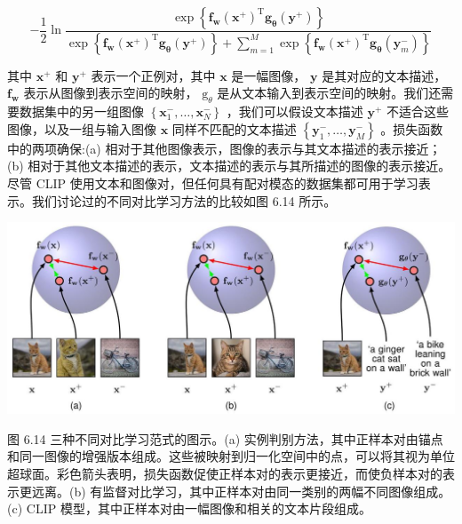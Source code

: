 \documentclass[10pt]{report}
\begin{document}
\[
- \frac{1}{2}\ln \frac{\exp \left\{  {{\mathbf{f}}_{\mathbf{w}}{\left( {\mathbf{x}}^{ + }\right) }^{\mathrm{T}}{\mathbf{g}}_{\mathbf{\theta }}\left( {\mathbf{y}}^{ + }\right) }\right\}  }{\exp \left\{  {{\mathbf{f}}_{\mathbf{w}}{\left( {\mathbf{x}}^{ + }\right) }^{\mathrm{T}}{\mathbf{g}}_{\mathbf{\theta }}\left( {\mathbf{y}}^{ + }\right) }\right\}   + \mathop{\sum }\limits_{{m = 1}}^{M}\exp \left\{  {{\mathbf{f}}_{\mathbf{w}}{\left( {\mathbf{x}}^{ + }\right) }^{\mathrm{T}}{\mathbf{g}}_{\mathbf{\theta }}\left( {\mathbf{y}}_{m}^{ - }\right) }\right\}  } \tag{6.21}
\]

其中 \({\mathbf{x}}^{ + }\) 和 \({\mathbf{y}}^{ + }\) 表示一个正例对，其中 \(\mathbf{x}\) 是一幅图像， \(\mathbf{y}\) 是其对应的文本描述， \({\mathbf{f}}_{\mathbf{w}}\) 表示从图像到表示空间的映射， \({\mathrm{g}}_{\theta }\) 是从文本输入到表示空间的映射。我们还需要数据集中的另一组图像 \(\left\{  {{\mathbf{x}}_{1}^{ - },\ldots ,{\mathbf{x}}_{N}^{ - }}\right\}\) ，我们可以假设文本描述 \({\mathbf{y}}^{ + }\) 不适合这些图像，以及一组与输入图像 \(\mathbf{x}\) 同样不匹配的文本描述 \(\left\{  {{\mathbf{y}}_{1}^{ - },\ldots ,{\mathbf{y}}_{M}^{ - }}\right\}\) 。损失函数中的两项确保:(a) 相对于其他图像表示，图像的表示与其文本描述的表示接近；(b) 相对于其他文本描述的表示，文本描述的表示与其所描述的图像的表示接近。尽管 CLIP 使用文本和图像对，但任何具有配对模态的数据集都可用于学习表示。我们讨论过的不同对比学习方法的比较如图 6.14 所示。

\begin{center}
\includegraphics[max width=1.0\textwidth]{images/0194e279-9b28-703a-88f4-c3ac21e2010d_212_239_346_1289_553_0.jpg}
\end{center}
\hspace*{3em} 

图 6.14 三种不同对比学习范式的图示。(a) 实例判别方法，其中正样本对由锚点和同一图像的增强版本组成。这些被映射到归一化空间中的点，可以将其视为单位超球面。彩色箭头表明，损失函数促使正样本对的表示更接近，而使负样本对的表示更远离。(b) 有监督对比学习，其中正样本对由同一类别的两幅不同图像组成。(c) CLIP 模型，其中正样本对由一幅图像和相关的文本片段组成。
\end{document}

